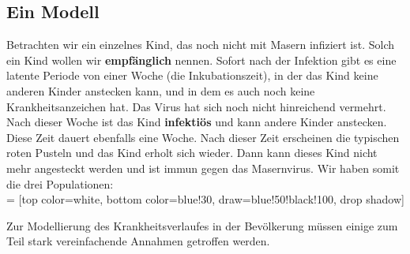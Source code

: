 \documentclass[%
11pt,%
twoside,%
titlepage,%
german,%
headsepline%
]{scrartcl}
\begin{document}
\subsection{Ein Modell}
Betrachten wir ein einzelnes Kind, das noch nicht mit Masern infiziert ist. Solch ein Kind wollen wir \textbf{empfänglich} nennen. Sofort nach der Infektion gibt es eine latente Periode von einer Woche (die Inkubationszeit), in der das Kind keine anderen Kinder anstecken kann, und in dem es auch noch keine Krankheitsanzeichen hat. Das Virus hat sich noch nicht hinreichend vermehrt. Nach dieser Woche ist das Kind \textbf{infektiös} und kann andere Kinder anstecken. Diese Zeit dauert ebenfalls eine Woche. Nach dieser Zeit erscheinen die typischen roten Pusteln und das Kind erholt sich wieder. Dann kann dieses Kind nicht mehr angesteckt werden und ist immun gegen das Masernvirus. Wir haben somit die drei Populationen:\\

 = [top color=white, bottom color=blue!30, 
                            draw=blue!50!black!100, drop shadow]

\begin{center}
\end{center}

Zur Modellierung des Krankheitsverlaufes in der Bevölkerung müssen einige zum Teil stark vereinfachende Annahmen getroffen werden.
\end{document}
